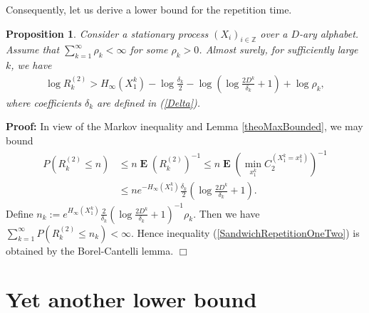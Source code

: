 \documentclass[a4paper,12pt]{article}
\newcommand{\okra}[1]{\left( #1 \right)}
\DeclareMathOperator{\mean}{\mathbf{E}}
\newtheorem{proposition}{Proposition}
\newenvironment*{proof}{\begin{trivlist}\item[]
\noindent\textbf{Proof:}}{$\Box$\par\end{trivlist}}
\begin{document}
Consequently, let us derive a lower bound for the repetition time.
\begin{proposition}
  \label{theoSandwichRepetitionOneTwo}
  Consider a stationary process $(X_i)_{i\in\mathbb{Z}}$ over a
  $D$-ary alphabet.  Assume that $\sum_{k=1}^\infty \rho_k<\infty$ for
  some $\rho_k>0$.  Almost surely, for sufficiently large $k$, we have
  \begin{align}
    \label{SandwichRepetitionOneTwo}
    \log R^{(2)}_k>H_\infty(X_1^k)-\log \frac{\delta_k}{2}
    -\log\okra{\log\frac{2D^k}{\delta_k}+1}
    +\log\rho_k
    ,
  \end{align}
  where coefficients $\delta_k$ are defined in (\ref{Delta}).
\end{proposition}
\begin{proof}
  In view of the Markov inequality and Lemma \ref{theoMaxBounded},
  we may bound
  \begin{align}
    P(R^{(2)}_k\le n)
    &\le n\mean \okra{R^{(2)}_k}^{-1}
      \le n\mean \okra{\min_{x_1^k} C^{(X_1^k=x_1^k)}_2}^{-1}
      \nonumber\\
    &\le n e^{-H_\infty(X_1^k)}
      \frac{\delta_k}{2}\okra{\log\frac{2D^k}{\delta_k}+1}.
  \end{align}
  Define
  $n_k:=e^{H_\infty(X_1^k)}
  \frac{2}{\delta_k}\okra{\log\frac{2D^k}{\delta_k}+1}^{-1}\rho_k$. Then
  we have $\sum_{k=1}^\infty P(R^{(2)}_k\le n_k)<\infty$. Hence
  inequality (\ref{SandwichRepetitionOneTwo}) is obtained by the
  Borel-Cantelli lemma.
\end{proof}

\section{Yet another lower bound}
\label{secYetAnother}
\end{document}
